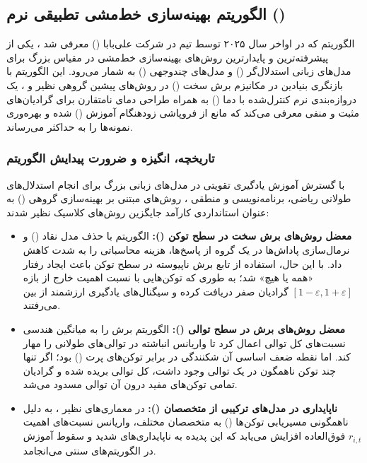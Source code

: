 \subsection{الگوریتم بهینه‌سازی خط‌مشی تطبیقی نرم ()}

الگوریتم  که در اواخر سال ۲۰۲۵ توسط تیم  در شرکت علی‌بابا () معرفی شد \cite{gao2025sapo}، یکی از پیشرفته‌ترین و پایدارترین روش‌های بهینه‌سازی خط‌مشی در مقیاس بزرگ برای مدل‌های زبانی استدلال‌گر () و مدل‌های چندوجهی () به شمار می‌رود. این الگوریتم با بازنگری بنیادین در مکانیزم برش سخت () در روش‌های پیشین گروهی نظیر  \cite{shao2024deepseekmath} و  \cite{zheng2025group}، یک دروازه‌بندی نرم کنترل‌شده با دما () به همراه طراحی دمای نامتقارن برای گرادیان‌های مثبت و منفی معرفی می‌کند که مانع از فروپاشی زودهنگام آموزش () شده و بهره‌وری نمونه‌ها را به حداکثر می‌رساند.

\subsubsection*{تاریخچه، انگیزه و ضرورت پیدایش الگوریتم}

با گسترش آموزش یادگیری تقویتی در مدل‌های زبانی بزرگ برای انجام استدلال‌های طولانی ریاضی، برنامه‌نویسی و منطقی \cite{openai2024learning, deepseek2025deepseekr1, qwen2025qwen3}، روش‌های مبتنی بر بهینه‌سازی گروهی () به عنوان استانداردی کارآمد جایگزین روش‌های کلاسیک نظیر  شدند:
\begin{itemize}
    \item \textbf{معضل روش‌های برش سخت در سطح توکن ():} الگوریتم  \cite{shao2024deepseekmath} با حذف مدل نقاد () و نرمال‌سازی پاداش‌ها در یک گروه از پاسخ‌ها، هزینه محاسباتی را به شدت کاهش داد. با این حال، استفاده از تابع برش ناپیوسته در سطح توکن باعث ایجاد رفتار «همه یا هیچ» شد؛ به طوری که توکن‌هایی با نسبت اهمیت خارج از بازه $[1-\varepsilon, 1+\varepsilon]$ گرادیان صفر دریافت کرده و سیگنال‌های یادگیری ارزشمند از بین می‌رفتند.
    \item \textbf{معضل روش‌های برش در سطح توالی ():} الگوریتم  \cite{zheng2025group} برش را به میانگین هندسی نسبت‌های کل توالی اعمال کرد تا واریانس انباشته در توالی‌های طولانی را مهار کند. اما نقطه ضعف اساسی آن شکنندگی در برابر توکن‌های پرت () بود؛ اگر تنها چند توکن ناهمگون در یک توالی وجود داشت، کل توالی بریده شده و گرادیان تمامی توکن‌های مفید درون آن توالی مسدود می‌شد.
    \item \textbf{ناپایداری در مدل‌های ترکیبی از متخصصان ():} در معماری‌های  نظیر ، به دلیل ناهمگونی مسیریابی توکن‌ها () به متخصصان مختلف، واریانس نسبت‌های اهمیت $r_{i,t}$ فوق‌العاده افزایش می‌یابد که این پدیده به ناپایداری‌های شدید و سقوط آموزش در الگوریتم‌های سنتی می‌انجامد.
\end{itemize}

